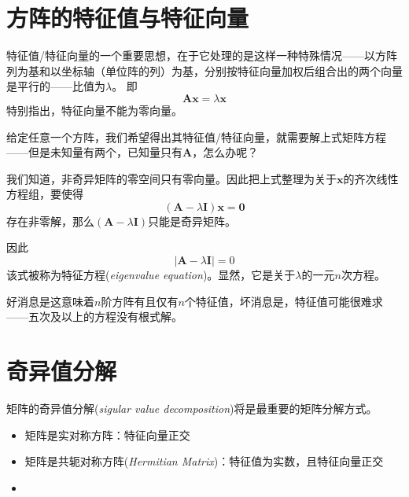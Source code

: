\section{方阵的特征值与特征向量}

        特征值/特征向量的一个重要思想，在于它处理的是这样一种特殊情况——以方阵列为基和以坐标轴（单位阵的列）为基，分别按特征向量加权后组合出的两个向量是平行的——比值为$\lambda$。
        即
        \begin{equation}
            \bm{A}\bm{x}=\lambda \bm{x}
        \end{equation}
        特别指出，特征向量不能为零向量。

        给定任意一个方阵，我们希望得出其特征值/特征向量，就需要解上式矩阵方程——但是未知量有两个，已知量只有$\bm{A}$，怎么办呢？

        我们知道，非奇异矩阵的零空间只有零向量。因此把上式整理为关于$\bm{x}$的齐次线性方程组，要使得
        \begin{equation*}
            (\bm{A}-\lambda \bm{I})\bm{x}=\bm{0}
        \end{equation*}
        存在非零解，那么$(\bm{A}-\lambda \bm{I})$只能是奇异矩阵。

        因此
        \begin{equation}
            \left\vert \bm{A}-\lambda \bm{I}\right\vert=0
        \end{equation}
        该式被称为特征方程(\emph{eigenvalue equation})。显然，它是关于$\lambda$的一元$n$次方程。

        好消息是这意味着$n$阶方阵有且仅有$n$个特征值，坏消息是，特征值可能很难求——五次及以上的方程没有根式解。



\section{奇异值分解}
        矩阵的奇异值分解(\emph{sigular value decomposition})将是最重要的矩阵分解方式。

        \begin{itemize}
            \item 矩阵是实对称方阵：特征向量正交
            \item 矩阵是共轭对称方阵(\emph{Hermitian Matrix})：特征值为实数，且特征向量正交
            \item 
        \end{itemize}